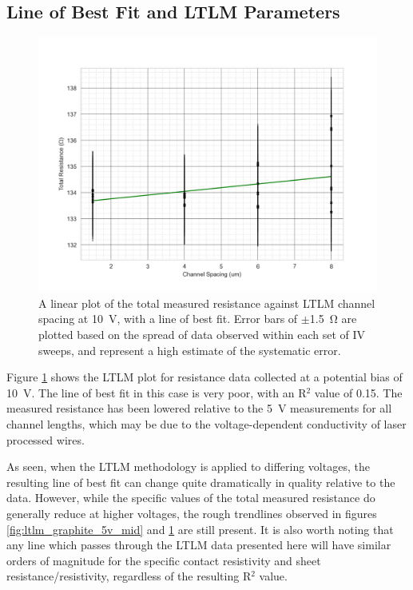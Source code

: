 \begin{refsection}
\subsection{Line of Best Fit and LTLM Parameters}
\begin{figure}[H]
    \centering
    \includegraphics[width=\linewidth]{Chapter7/Figs/Raster/LTLM_graphite_mid(10.0V).png}
    \caption{A linear plot of the total measured resistance against LTLM channel spacing at 10~\si{\volt}, with a line of best fit. Error bars of $\pm$1.5~\si{\ohm} are plotted based on the spread of data observed within each set of IV sweeps, and represent a high estimate of the systematic error.}
    \label{fig:ltlm_graphite_10v_mid}
\end{figure}

Figure \ref{fig:ltlm_graphite_10v_mid} shows the LTLM plot for resistance data collected at a potential bias of 10~\si{\volt}. The line of best fit in this case is very poor, with an R$^{2}$ value of 0.15. The measured resistance has been lowered relative to the 5~\si{\volt} measurements for all channel lengths, which may be due to the voltage-dependent conductivity of laser processed wires.

As seen, when the LTLM methodology is applied to differing voltages, the resulting line of best fit can change quite dramatically in quality relative to the data. However, while the specific values of the total measured resistance do generally reduce at higher voltages, the rough trendlines observed in figures \ref{fig:ltlm_graphite_5v_mid} and \ref{fig:ltlm_graphite_10v_mid} are still present. It is also worth noting that any line which passes through the LTLM data presented here will have similar orders of magnitude for the specific contact resistivity and sheet resistance/resistivity, regardless of the resulting R$^{2}$ value. 


\end{refsection}
